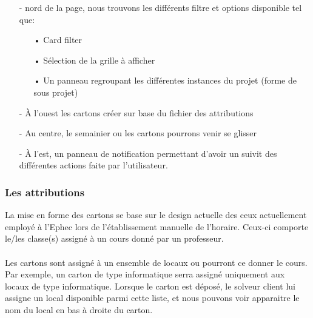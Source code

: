 \begin{itemize}	
	
	\item[-] nord de la page, nous trouvons les différents filtre et options disponible tel que:\\
	\begin{itemize}
		\item[•] Card filter\\
		\item[•] Sélection de la grille à afficher\\
		\item[•] Un panneau regroupant les différentes instances du projet (forme de sous projet)\\
	\end{itemize}
	\item[-] À l'ouest les cartons créer sur base du fichier des attributions\\
	\item[-] Au centre, le semainier ou les cartons pourrons venir se glisser\\
	\item[-] À l'est, un panneau de notification permettant d'avoir un suivit des différentes actions faite par l'utilisateur.
\end{itemize}
\subsubsection{Les attributions}
La mise en forme des cartons se base sur le design actuelle des ceux actuellement employé à l'Ephec lors de l'établissement manuelle de l'horaire. Ceux-ci comporte le/les classe(s) assigné à un cours donné par un professeur.\\
\\
Les cartons sont assigné à un ensemble de locaux ou pourront ce donner le cours. Par exemple, un carton de type informatique serra assigné uniquement aux locaux de type informatique. Lorsque le carton est déposé, le solveur client lui assigne un local disponible parmi cette liste, et nous pouvons voir apparaitre le nom du local en bas à droite du carton.
